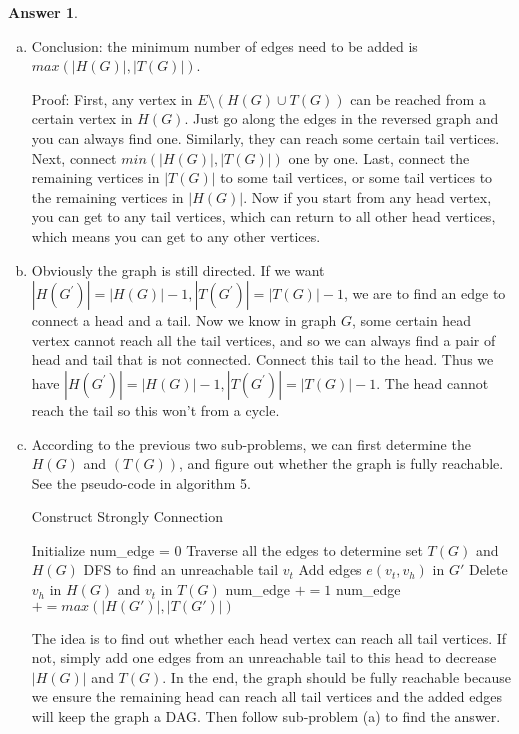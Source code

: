 \documentclass{article}
\theoremstyle{definition}
\newtheorem{ans}{Answer}
\begin{document}
\begin{ans}
	~
	
	\begin{enumerate}[(a)]
		\item Conclusion: the minimum number of edges need to be added is $max(|H(G)|,|T(G)|)$.
		
		Proof: First, any vertex in $E\setminus(H(G)\cup T(G))$ can be reached from a certain vertex in $H(G)$. Just go along the edges in the reversed graph and you can always find one. Similarly, they can reach some certain tail vertices. Next, connect $min(|H(G)|,|T(G)|)$ one by one. Last, connect the remaining vertices in $|T(G)|$ to some tail vertices, or some tail vertices to the remaining vertices in $|H(G)|$. Now if you start from any head vertex, you can get to any tail vertices, which can return to all other head vertices, which means you can get to any other vertices.
		
		\item Obviously the graph is still directed. If we want $\left|H\left(G^{\prime}\right)\right|=|H(G)|-1,\left|T\left(G^{\prime}\right)\right|=|T(G)|-1$, we are to find an edge to connect a head and a tail. Now we know in graph $G$, some certain head vertex cannot reach all the tail vertices, and so we can always find a pair of head and tail that is not connected. Connect this tail to the head. Thus we have $\left|H\left(G^{\prime}\right)\right|=|H(G)|-1,\left|T\left(G^{\prime}\right)\right|=|T(G)|-1$. The head cannot reach the tail so this won't from a cycle.
		
		\item According to the previous two sub-problems, we can first determine the $H(G)$ and $(T(G))$, and figure out whether the graph is fully reachable.
		See the pseudo-code in algorithm 5. 
		
		\begin{algorithm}
			\caption{Construct Strongly Connection}
			\BlankLine
			Initialize num\_edge = 0\;
			Traverse all the edges to determine set $T(G)$ and $H(G)$\;
			{
				DFS to find an unreachable tail $v_t$\;
				Add edges $e(v_t, v_h)$ in $G'$\;
				Delete $v_h$ in $H(G)$ and $v_t$ in $T(G)$\;
				num\_edge $+=1$\;
			}
			num\_edge $+=max(|H(G')|,|T(G')|)$
		\end{algorithm}
	
		The idea is to find out whether each head vertex can reach all tail vertices. If not, simply add one edges from an unreachable tail to this head to decrease $|H(G)|$ and $T(G)$. In the end, the graph should be fully reachable because we ensure the remaining head can reach all tail vertices and the added edges will keep the graph a DAG. Then follow sub-problem (a) to find the answer.
		

\end{enumerate}
\end{ans}
\end{document}
